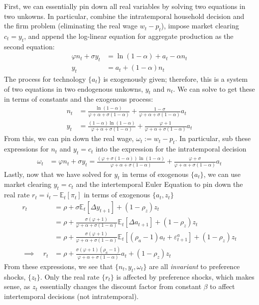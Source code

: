 \documentclass[12pt]{article}
\theoremstyle{plain}
\theoremstyle{definition}
\theoremstyle{remark}
\newcommand{\E}{\mathbb{E}}
\begin{document}
First, we can essentially pin down all real variables by solving two
equations in two unkowns. In particular, combine the intratemporal
household decision and the firm problem (eliminating the real wage
$w_t-p_t$), impose market clearing $c_t=y_t$, and append the log-linear
equation for aggregate production as the second equation:
\begin{align*}
  \varphi n_t + \sigma y_t &= \ln(1-\alpha) + a_t - \alpha n_t
  \\
  y_t &= a_t + (1-\alpha)n_t
\end{align*}
The process for technology $\{a_t\}$ is exogenously given; therefore,
this is a system of two equations in two endogenous unkowns, $y_t$ and
$n_t$. We can solve to get these in terms of constants and the exogenous
process:
\begin{align*}
   n_t
   &= \frac{\ln(1-\alpha)}{\varphi +\alpha+ \sigma(1-\alpha)}
   + \frac{1-\sigma}{\varphi +\alpha+ \sigma(1-\alpha)} a_t
   \\
    y_t
    &=
    \frac{(1-\alpha)\ln(1-\alpha)}{\varphi +\alpha+ \sigma(1-\alpha)}
    + \frac{\varphi + 1}{\varphi +\alpha+ \sigma(1-\alpha)}
      a_t
\end{align*}
From this, we can pin down the real wage, $\omega_t:=w_t-p_t$. In
particular, sub these expressions for $n_t$ and $y_t=c_t$ into the
expression for the intratemporal decision
\begin{align*}
  \omega_t
  &= \varphi n_t + \sigma y_t
  =
  \frac{(\varphi+\sigma(1-\alpha))\ln(1-\alpha)}{\varphi +\alpha+ \sigma(1-\alpha)}
  + \frac{\varphi + \sigma}{\varphi +\alpha+ \sigma(1-\alpha)}
  a_t
\end{align*}
Lastly, now that we have solved for $y_t$ in terms of exogenous
$\{a_t\}$, we can use market clearing $y_t=c_t$ and the intertemporal
Euler Equation to pin down the real rate $r_t = i_t - \E_t[\pi_t]$ in
terms of exogenous $\{a_t,z_t\}$
\begin{align*}
  r_t
  &=
  \rho
  + \sigma\E_t[\Delta y_{t+1}]
  + (1-\rho_z) z_t
  \\
  &=
  \rho
  +
  \frac{\sigma(\varphi + 1)}{\varphi +\alpha+ \sigma(1-\alpha)}
  \E_t\left[\Delta a_{t+1}\right]
  + (1-\rho_z) z_t
  \\
  &=
  \rho
  +
  \frac{\sigma(\varphi + 1)}{\varphi +\alpha+ \sigma(1-\alpha)}
  \E_t\left[(\rho_a-1)a_t+\varepsilon^a_{t+1}\right]
  + (1-\rho_z) z_t
  \\
  \implies\quad
  r_t
  &=
  \rho
  +
  \frac{\sigma(\varphi + 1)(\rho_a-1)}{\varphi +\alpha+ \sigma(1-\alpha)}
  a_t
  + (1-\rho_z) z_t
\end{align*}
From these expressions, we see that $\{n_t,y_t,\omega_t\}$ are all
\emph{invariant} to preference shocks, $\{z_t\}$.
Only the real rate $\{r_t\}$ is affected by preference shocks, which
makes sense, as $z_t$ essentially changes the discount factor from
constant $\beta$ to affect intertemporal decisions (not intratemporal).
\end{document}
